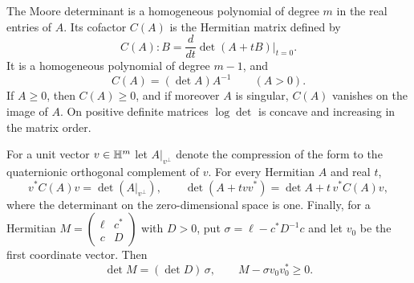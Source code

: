 \begin{lemma}\label{lem:moore}
The Moore determinant is a homogeneous polynomial of degree $m$ in the real entries of $A$. Its
cofactor $C(A)$ is the Hermitian matrix defined by
\begin{equation}\label{eq:cofactor}
C(A):B=\frac{d}{dt}\det(A+tB)\Big|_{t=0}.
\end{equation}
It is a homogeneous polynomial of degree $m-1$, and
\begin{equation}\label{eq:cofinv}
C(A)=(\det A)A^{-1}\qquad(A>0).
\end{equation}
If $A\ge0$, then $C(A)\ge0$, and if moreover $A$ is singular, $C(A)$ vanishes on the image of
$A$. On positive definite matrices $\log\det$ is concave and increasing in the matrix order.

For a unit vector $v\in\mathbb{H}^m$ let $A|_{v^\perp}$ denote the compression of the form to the
quaternionic orthogonal complement of $v$. For every Hermitian $A$ and real $t$,
\begin{equation}\label{eq:compress}
v^*C(A)v=\det(A|_{v^\perp}),\qquad\det(A+tvv^*)=\det A+t\,v^*C(A)v ,
\end{equation}
where the determinant on the zero-dimensional space is one. Finally, for a Hermitian
$M=\begin{pmatrix}\ell&c^*\\ c&D\end{pmatrix}$ with $D>0$, put $\sigma=\ell-c^*D^{-1}c$ and let $v_0$
be the first coordinate vector. Then
\begin{equation}\label{eq:schur}
\det M=(\det D)\,\sigma,\qquad M-\sigma v_0v_0^*\ge0 .
\end{equation}
\end{lemma}

